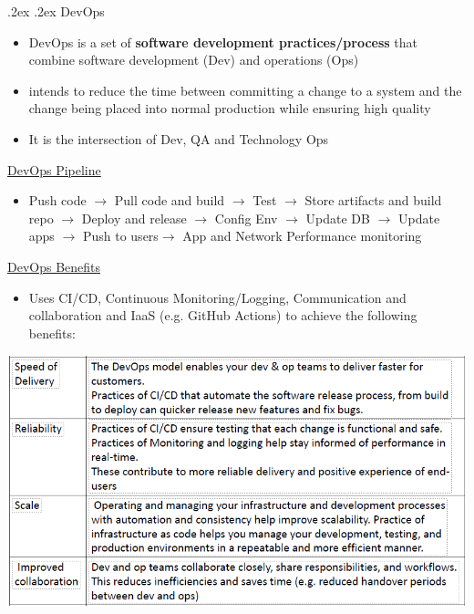 \documentclass[10pt,landscape,a4paper]{article}
\makeatletter
\renewcommand{\subsection}{\@startsection{subsection}{1}{0mm}%
	{.2ex}%
	{.2ex}%
	{\sffamily\bfseries}}
\renewcommand{\subsubsection}{\@startsection{subsubsection}{1}{0mm}%
	{.2ex}%
	{.2ex}%
	{\rmfamily\bfseries}}
\makeatother
\begin{document}
\begin{multicols*}{4}
		\subsubsection{DevOps}
		\begin{itemize}
			\item DevOps is a set of \textbf{software development practices/process} that combine software development (Dev) and operations (Ops)
			\item intends to reduce the	time between committing a change to a system and the change being placed into normal production while ensuring high quality
			\item It is the intersection of Dev, QA and Technology Ops
		\end{itemize}
		\underline{DevOps Pipeline}
		\begin{itemize}
			\item Push code $\rightarrow$ Pull code and build $\rightarrow$ Test $\rightarrow$ Store artifacts and build repo $\rightarrow$ Deploy and release $\rightarrow$ Config Env $\rightarrow$ Update DB $\rightarrow$ Update apps $\rightarrow$ Push to users$\rightarrow$ App and Network Performance monitoring
		\end{itemize}
		\underline{DevOps Benefits}
		\begin{itemize}
			\item Uses CI/CD, Continuous Monitoring/Logging, Communication and collaboration and IaaS (e.g. GitHub Actions) to achieve the following benefits:
		\end{itemize}
		\begin{center}
			\includegraphics[width=0.64\columnwidth]{devops_benefits}
		\end{center}

\end{multicols*}
\end{document}
